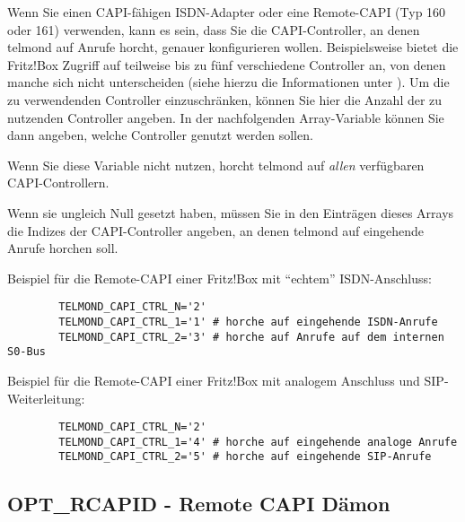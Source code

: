 \begin{description}
  Wenn Sie einen CAPI-fähigen ISDN-Adapter oder eine Remote-CAPI (Typ 160 oder
  161) verwenden, kann es sein, dass Sie die CAPI-Controller, an denen telmond
  auf Anrufe horcht, genauer konfigurieren wollen. Beispielsweise bietet die
  Fritz!Box Zugriff auf teilweise bis zu fünf verschiedene Controller an, von
  denen manche sich nicht unterscheiden (siehe hierzu die Informationen unter
  ).
  Um die zu verwendenden Controller einzuschränken, können Sie hier die Anzahl
  der zu nutzenden Controller angeben. In der nachfolgenden Array-Variable
   können Sie dann angeben, welche Controller
  genutzt werden sollen.

  Wenn Sie diese Variable nicht nutzen, horcht telmond auf \emph{allen}
  verfügbaren CAPI-Controllern.


  Wenn sie  ungleich Null gesetzt haben, müssen Sie
  in den Einträgen dieses Arrays die Indizes der CAPI-Controller angeben, an
  denen telmond auf eingehende Anrufe horchen soll.

  Beispiel für die Remote-CAPI einer Fritz!Box mit ``echtem'' ISDN-Anschluss:

\begin{example}
\begin{verbatim}
        TELMOND_CAPI_CTRL_N='2'
        TELMOND_CAPI_CTRL_1='1' # horche auf eingehende ISDN-Anrufe
        TELMOND_CAPI_CTRL_2='3' # horche auf Anrufe auf dem internen S0-Bus
\end{verbatim}
\end{example}

  Beispiel für die Remote-CAPI einer Fritz!Box mit analogem Anschluss und
  SIP-Weiterleitung:

\begin{example}
\begin{verbatim}
        TELMOND_CAPI_CTRL_N='2'
        TELMOND_CAPI_CTRL_1='4' # horche auf eingehende analoge Anrufe
        TELMOND_CAPI_CTRL_2='5' # horche auf eingehende SIP-Anrufe
\end{verbatim}
\end{example}

\end{description}

\subsection{OPT\_RCAPID - Remote CAPI Dämon}

